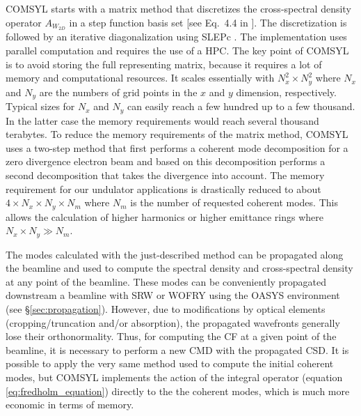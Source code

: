 \documentclass{iucr}              %
\begin{document}

 
COMSYL starts with a matrix method that discretizes the cross-spectral density operator $A_{W_{2D}}$ in a step function basis set [see Eq.~4.4 in \cite{glassThesis}]. The discretization is followed by an iterative diagonalization using SLEPc \cite{SLEPc}. The implementation uses parallel computation and requires the use of a HPC. The key point of COMSYL is to avoid storing the full representing matrix, because it requires a lot of memory and computational resources. It scales essentially with $N_x^2 \times N_y^2$ where $N_x$ and $N_y$ are the numbers of grid points in the $x$ and $y$ dimension, respectively. Typical sizes for $N_x$ and $N_y$ can easily reach a few hundred up to a few thousand. In the latter case the memory requirements would reach several thousand terabytes. To reduce the memory requirements of the matrix method, COMSYL uses a two-step method that first performs a coherent mode decomposition for a zero divergence electron beam and based on this decomposition performs a second decomposition that takes the divergence into account. The memory requirement for our undulator applications is drastically reduced to about $4 \times N_x \times N_y \times N_m$ where $N_m$ is the number of requested coherent modes. This allows the calculation of higher harmonics or higher emittance rings where $N_x \times N_y \gg N_m$. 

The modes calculated with the just-described method can be propagated along the beamline and used to compute the spectral density and cross-spectral density at any point of the beamline. These modes can be conveniently propagated downstream a beamline with SRW or WOFRY using the OASYS environment (see \S\ref{sec:propagation}). However, due to modifications by optical elements (cropping/truncation and/or absorption), the propagated wavefronts generally lose their orthonormality. Thus, for computing the CF at a given point of the beamline, it is necessary to perform a new CMD with the propagated CSD. It is possible to apply the very same method used to compute the initial coherent modes, but COMSYL implements the action of the integral operator (equation \ref{eq:fredholm_equation}) directly to the the coherent modes, which is much more economic in terms of memory.
\end{document}
